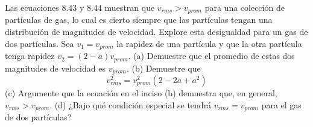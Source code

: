 \item Las ecuaciones 8.43 y 8.44 muestran que $v_{rms} > v_{prom}$ para una colección de partículas de gas, lo cual es cierto siempre que las partículas tengan una distribución de magnitudes de velocidad. Explore esta desigualdad para un gas de dos partículas. Sea $v_1 = v_{prom}$ la rapidez de una partícula y que la otra partícula tenga rapidez $v_2 = (2 - a)v_{prom}$. 
(a) Demuestre que el promedio de estas dos magnitudes de velocidad es $v_{prom}$. 
(b) Demuestre que
$$ v_{rms}^2 = v_{prom}^2(2 - 2a + a^2) $$
(c) Argumente que la ecuación en el inciso (b) demuestra que, en general, $v_{rms} > v_{prom}$. 
(d) ¿Bajo qué condición especial se tendrá $v_{rms} = v_{prom}$ para el gas de dos partículas?
